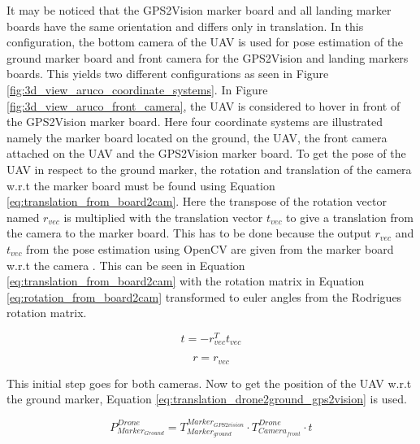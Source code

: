 \documentclass[../Head/report.tex]{subfiles}
\begin{document}
It may be noticed that the GPS2Vision marker board and all landing marker boards have the same orientation and differs only in translation. In this configuration, the bottom camera of the UAV is used for pose estimation of the ground marker board and front camera for the GPS2Vision and landing markers boards. This yields two different configurations as seen in Figure \ref{fig:3d_view_aruco_coordinate_systems}. In Figure \ref{fig:3d_view_aruco_front_camera}, the UAV is considered to hover in front of the GPS2Vision marker board. Here four coordinate systems are illustrated namely the marker board located on the ground, the UAV, the front camera attached on the UAV and the GPS2Vision marker board. To get the pose of the UAV in respect to the ground marker, the rotation and translation of the camera w.r.t  the marker board must be found using Equation \ref{eq:translation_from_board2cam}. Here the transpose of the rotation vector named $r_{vec}$ is multiplied with the translation vector $t_{vec}$ to give a translation from the camera to the marker board. This has to be done because the output $r_{vec}$ and $t_{vec}$ from the pose estimation using OpenCV are given from the marker board w.r.t the camera \cite{theExtrinsicCameraMatrix}. This can be seen in Equation \ref{eq:translation_from_board2cam} with the rotation matrix in Equation \ref{eq:rotation_from_board2cam} transformed to euler angles from the Rodrigues rotation matrix. 

\begin{equation}
	t = -r_{vec}^T t_{vec} 
	\label{eq:translation_from_board2cam}  
\end{equation} 

\begin{equation}
	r = r_{vec} 
	\label{eq:rotation_from_board2cam}  
\end{equation} 

This initial step goes for both cameras. Now to get the position of the UAV w.r.t the ground marker, Equation \ref{eq:translation_drone2ground_gps2vision} is used.

\begin{equation}
	P^{Drone}_{Marker_{Ground}} = T^{Marker_{GPS2vision}}_{Marker_{ground}} \cdot T^{Drone}_{Camera_{front}} \cdot t
	\label{eq:translation_drone2ground_gps2vision} 
\end{equation}
\end{document}
